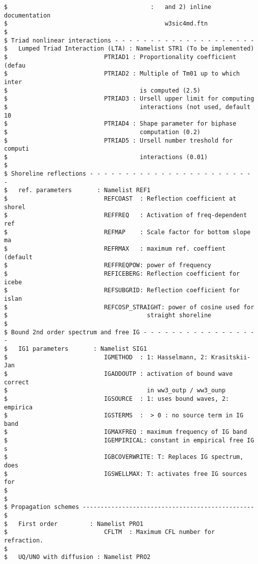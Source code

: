 \begin{footnotesize}
\begin{verbatim}
$                                        :   and 2) inline documentation
$                                            w3sic4md.ftn
$
$ Triad nonlinear interactions - - - - - - - - - - - - - - - - - - - -
$   Lumped Triad Interaction (LTA) : Namelist STR1 (To be implemented)
$                           PTRIAD1 : Proportionality coefficient (defau
$                           PTRIAD2 : Multiple of Tm01 up to which inter
$                                     is computed (2.5)
$                           PTRIAD3 : Ursell upper limit for computing
$                                     interactions (not used, default 10
$                           PTRIAD4 : Shape parameter for biphase
$                                     computation (0.2)
$                           PTRIAD5 : Ursell number treshold for computi
$                                     interactions (0.01)
$
$ Shoreline reflections - - - - - - - - - - - - - - - - - - - - - - - - 
$   ref. parameters       : Namelist REF1 
$                           REFCOAST  : Reflection coefficient at shorel
$                           REFFREQ   : Activation of freq-dependent ref
$                           REFMAP    : Scale factor for bottom slope ma
$                           REFRMAX   : maximum ref. coeffient (default 
$                           REFFREQPOW: power of frequency 
$                           REFICEBERG: Reflection coefficient for icebe
$                           REFSUBGRID: Reflection coefficient for islan
$                           REFCOSP_STRAIGHT: power of cosine used for 
$                                       straight shoreline
$
$ Bound 2nd order spectrum and free IG - - - - - - - - - - - - - - - - -
$   IG1 parameters       : Namelist SIG1
$                           IGMETHOD  : 1: Hasselmann, 2: Krasitskii-Jan
$                           IGADDOUTP : activation of bound wave correct
$                                       in ww3_outp / ww3_ounp
$                           IGSOURCE  : 1: uses bound waves, 2: empirica
$                           IGSTERMS  :  > 0 : no source term in IG band
$                           IGMAXFREQ : maximum frequency of IG band
$                           IGEMPIRICAL: constant in empirical free IG s
$                           IGBCOVERWRITE: T: Replaces IG spectrum, does
$                           IGSWELLMAX: T: activates free IG sources for
$
$
$ Propagation schemes ------------------------------------------------ $
$   First order         : Namelist PRO1
$                           CFLTM  : Maximum CFL number for refraction.
$
$   UQ/UNO with diffusion : Namelist PRO2

\end{verbatim}
\end{footnotesize}
